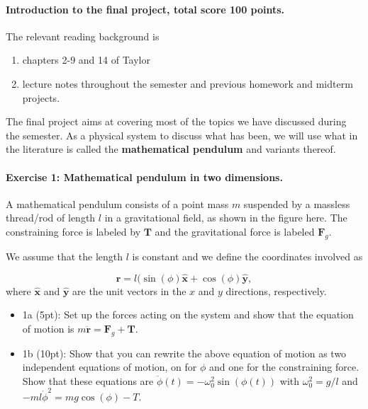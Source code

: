 \documentclass[%
oneside,                 %
final,                   %
10pt]{article}
\begin{document}
\noindent
\paragraph{Introduction to the final project, total score 100 points.}
The relevant reading background is
\begin{enumerate}
\item chapters 2-9 and 14 of Taylor

\item lecture notes throughout the semester and previous homework and midterm projects.
\end{enumerate}

\noindent
The final project aims at covering most of the topics we have discussed during the semester. As a physical system to discuss what has been, we will use what in the literature is called the \textbf{mathematical pendulum} and variants thereof. 

\paragraph{Exercise 1: Mathematical pendulum in two dimensions.}
A mathematical pendulum consists of a point mass $m$ suspended by a massless thread/rod of length $l$ in a gravitational field, as shown in the figure here. The constraining force is labeled by $\bm{T}$
and the gravitational force is labeled $\bm{F}_g$.


We assume that the length $l$ is constant and we define the coordinates involved as

\[
\bm{r} = l(\sin(\phi)\bm{\hat{x}}+\cos(\phi)\bm{\hat{y}},
\]
where $\bm{\hat{x}}$ and $\bm{\hat{y}}$ are the unit vectors in the $x$ and $y$ directions, respectively.

\begin{itemize}
\item 1a (5pt): Set up the forces acting on the system and show that the equation of motion is $m\ddot{\bm{r}}=\bm{F}_g+\bm{T}$.

\item 1b (10pt): Show that you can rewrite the above equation of motion as two independent equations of motion, on for $\phi$ and one for the constraining force. Show that these equations are $\ddot{\phi}(t)=-\omega_0^2\sin{(\phi(t))}$ with $\omega_0^2=g/l$ and $-ml\dot{\phi}^2=mg\cos{(\phi)}-T$.
\end{itemize}
\end{document}
